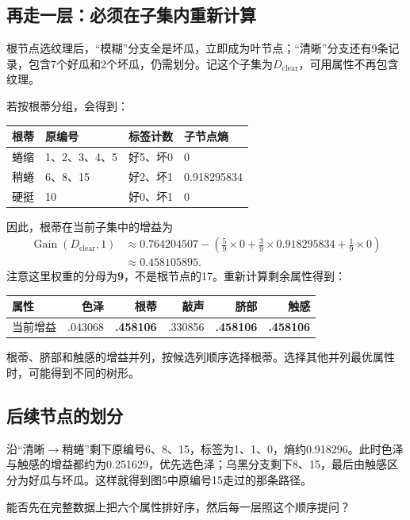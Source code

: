 \documentclass[UTF8,a4paper,11pt,fontset=fandol]{ctexart}
\numberwithin{equation}{subsection}
\begin{document}
\clearpage
\subsection{再走一层：必须在子集内重新计算}
根节点选纹理后，“模糊”分支全是坏瓜，立即成为叶节点；“清晰”分支还有9条记录，包含7个好瓜和2个坏瓜，仍需划分。记这个子集为$D_{\mathrm{clear}}$，可用属性不再包含纹理。

若按根蒂分组，会得到：
\par\noindent\begin{tabularx}{\textwidth}{L{1.5cm}Y L{2.6cm}L{2.5cm}}
\toprule
根蒂 & 原编号 & 标签计数 & 子节点熵\\
\midrule
蜷缩 & 1、2、3、4、5 & 好5、坏0 & 0\\
稍蜷 & 6、8、15 & 好2、坏1 & 0.918295834\\
硬挺 & 10 & 好0、坏1 & 0\\
\bottomrule
\end{tabularx}\par
因此，根蒂在当前子集中的增益为
\begin{equation}
\begin{aligned}
\operatorname{Gain}(D_{\mathrm{clear}},1)
&\approx0.764204507
-\left(\frac59\times0+\frac39\times0.918295834+\frac19\times0\right)\\
&\approx0.458105895.
\end{aligned}
\end{equation}
注意这里权重的分母为\textbf{9}，不是根节点的17。重新计算剩余属性得到：
\begin{center}
\begin{tabular}{lrrrrr}
\toprule
属性 & 色泽 & 根蒂 & 敲声 & 脐部 & 触感\\
\midrule
当前增益 & .043068 & \textbf{.458106} & .330856 & \textbf{.458106} & \textbf{.458106}\\
\bottomrule
\end{tabular}
\end{center}
根蒂、脐部和触感的增益并列，按候选列顺序选择根蒂。选择其他并列最优属性时，可能得到不同的树形。

\subsection{后续节点的划分}
沿“清晰$\to$稍蜷”剩下原编号6、8、15，标签为1、1、0，熵约0.918296。此时色泽与触感的增益都约为0.251629，优先选色泽；乌黑分支剩下8、15，最后由触感区分为好瓜与坏瓜。这样就得到图5中原编号15走过的那条路径。

\begin{questionbox}[思考题6]
能否先在完整数据上把六个属性排好序，然后每一层照这个顺序提问？
\end{questionbox}
\end{document}
